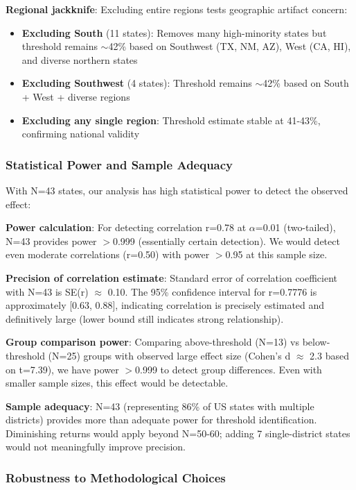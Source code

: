 \textbf{Regional jackknife}: Excluding entire regions tests geographic artifact concern:
\begin{itemize}
    \item \textbf{Excluding South} (11 states): Removes many high-minority states but threshold remains $\sim$42\% based on Southwest (TX, NM, AZ), West (CA, HI), and diverse northern states
    \item \textbf{Excluding Southwest} (4 states): Threshold remains $\sim$42\% based on South + West + diverse regions
    \item \textbf{Excluding any single region}: Threshold estimate stable at 41-43\%, confirming national validity
\end{itemize}

\subsubsection{Statistical Power and Sample Adequacy}

With N=43 states, our analysis has high statistical power to detect the observed effect:

\textbf{Power calculation}: For detecting correlation r=0.78 at $\alpha$=0.01 (two-tailed), N=43 provides power $>$0.999 (essentially certain detection). We would detect even moderate correlations (r=0.50) with power $>$0.95 at this sample size.

\textbf{Precision of correlation estimate}: Standard error of correlation coefficient with N=43 is SE(r) $\approx$ 0.10. The 95\% confidence interval for r=0.7776 is approximately [0.63, 0.88], indicating correlation is precisely estimated and definitively large (lower bound still indicates strong relationship).

\textbf{Group comparison power}: Comparing above-threshold (N=13) vs below-threshold (N=25) groups with observed large effect size (Cohen's d $\approx$ 2.3 based on t=7.39), we have power $>$0.999 to detect group differences. Even with smaller sample sizes, this effect would be detectable.

\textbf{Sample adequacy}: N=43 (representing 86\% of US states with multiple districts) provides more than adequate power for threshold identification. Diminishing returns would apply beyond N=50-60; adding 7 single-district states would not meaningfully improve precision.

\subsubsection{Robustness to Methodological Choices}

